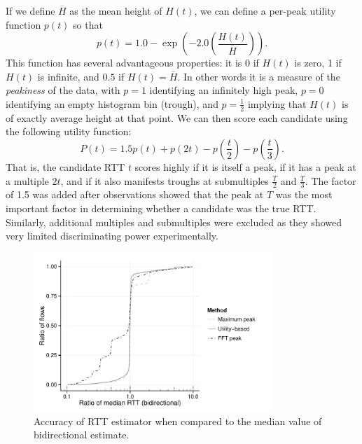 If we define $\overline{H}$ as the mean height of $H(t)$, we can define a per-peak utility function $p(t)$ so that 
\begin{equation*}
p(t) = 1.0 - \exp\left(-2.0 \left(\frac{H(t)}{\overline{H}}\right)\right) \mbox{.}
\end{equation*}
This function has several advantageous properties: it is 0 if $H(t)$ is zero, 1
if $H(t)$ is infinite, and $0.5$ if $H(t) = \overline{H}$.  In other
words it is a measure of the \emph{peakiness} of the data, with $p=1$ identifying
an infinitely high peak, $p=0$ identifying an empty histogram bin (trough), and $p=\frac{1}{2}$ 
implying that $H(t)$ is of exactly average height at that point. We can then score each candidate using the following utility function:
$$
P(t) = 1.5 p(t) + p(2t) - p\left(\frac{t}{2}\right) - p\left(\frac{t}{3}\right).
$$
That is, the candidate RTT $t$ scores highly if it is itself a peak, if it has a peak
at a multiple $2t$, and if it also manifests troughs at submultiples $\frac{T}{2}$ and $\frac{T}{3}$.
The factor of 1.5 was added after observations
showed that the peak at $T$ was the most important factor in determining
whether a candidate was the true RTT. Similarly, additional multiples and submultiples 
were excluded as they showed very limited discriminating power experimentally.

\begin{figure}
  \centering
  \includegraphics[width=0.8\textwidth]{figures/malawi/rttcomp.pdf}
  \caption{Accuracy of RTT estimator when compared to the median value of bidirectional estimate.}
\end{figure}

